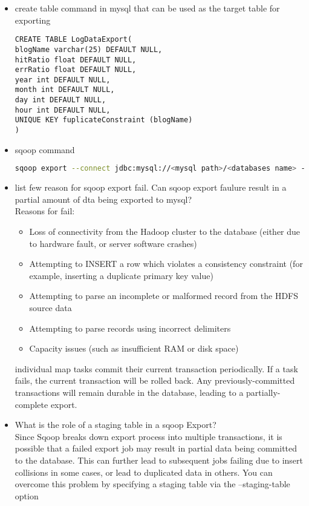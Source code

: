 \documentclass[12pt]{article}
\begin{document}
	\begin{itemize}
		\item create table command in mysql that can be used as the target table for exporting\\
		\begin{lstlisting}
CREATE TABLE LogDataExport(
blogName varchar(25) DEFAULT NULL,
hitRatio float DEFAULT NULL,
errRatio float DEFAULT NULL,
year int DEFAULT NULL,
month int DEFAULT NULL,
day int DEFAULT NULL,
hour int DEFAULT NULL,
UNIQUE KEY fuplicateConstraint (blogName)
)
	\end{lstlisting}

	\item sqoop command \\
	\begin{lstlisting}[language = bash]
sqoop export --connect jdbc:mysql://<mysql path>/<databases name> --username root --table logdata -m 1 --export-dir <exprot dir>  --input-fields-terminated-by '\t' --input-null-string 'This is a Null String' --input-null-non-string '\\N'
	\end{lstlisting}
	
	\item list few reason for sqoop export fail. Can sqoop export faulure result in a partial amount of dta being exported to mysql?\\
	Reasons for fail:
	\begin{itemize}
		\item Loss of connectivity from the Hadoop cluster to the database (either due to hardware fault, or server software crashes)
		\item Attempting to INSERT a row which violates a consistency constraint (for example, inserting a duplicate primary key value)
		\item Attempting to parse an incomplete or malformed record from the HDFS source data
		\item Attempting to parse records using incorrect delimiters
		\item Capacity issues (such as insufficient RAM or disk space)
		\end{itemize}
		individual map tasks commit their current transaction periodically. If a task fails, the current transaction will be rolled back. Any previously-committed transactions will remain durable in the database, leading to a partially-complete export.
		\item What is the role of a staging table in a sqoop Export?\\
		Since Sqoop breaks down export process into multiple transactions, it is possible that a failed export job may result in partial data being committed to the database. This can further lead to subsequent jobs failing due to insert collisions in some cases, or lead to duplicated data in others. You can overcome this problem by specifying a staging table via the --staging-table option
		
	\end{itemize}
	
\end{document}
